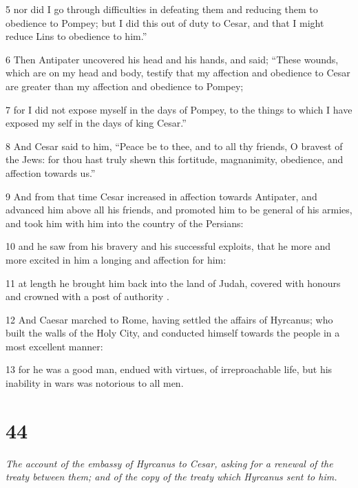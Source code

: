 \par 5 nor did I go through difficulties in defeating them and reducing them to obedience to Pompey; but I did this out of duty to Cesar, and that I might reduce Lins to obedience to him.” 

\par 6 Then Antipater uncovered his head and his hands, and said; “These wounds, which are on my head and body, testify that my affection and obedience to Cesar are greater than my affection and obedience to Pompey; 

\par 7 for I did not expose myself in the days of Pompey, to the things to which I have exposed my self in the days of king Cesar.” 

\par 8 And Cesar said to him, “Peace be to thee, and to all thy friends, O bravest of the Jews: for thou hast truly shewn this fortitude, magnanimity, obedience, and affection towards us.” 

\par 9 And from that time Cesar increased in affection towards Antipater, and advanced him above all his friends, and promoted him to be general of his armies, and took him with him into the country of the Persians: 

\par 10 and he saw from his bravery and his successful exploits, that he more and more excited in him a longing and affection for him: 

\par 11 at length he brought him back into the land of Judah, covered with honours and crowned with a post of authority . 

\par 12 And Caesar marched to Rome, having settled the affairs of Hyrcanus; who built the walls of the Holy City, and conducted himself towards the people in a most excellent manner: 

\par 13 for he was a good man, endued with virtues, of irreproachable life, but his inability in wars was notorious to all men. 


\chapter{44}

\par \textit{The account of the embassy of Hyrcanus to Cesar, asking for a renewal of the treaty between them; and of the copy of the treaty which Hyrcanus sent to him.}


